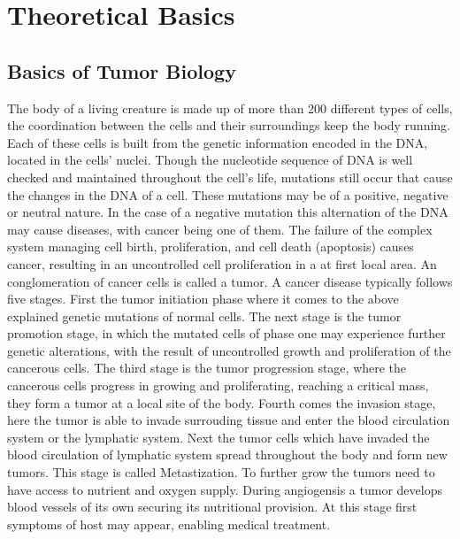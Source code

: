 \section{Theoretical Basics}
\subsection{Basics of Tumor Biology}
The body of a living creature is made up of more than 200 different types of cells, the coordination between the cells and their surroundings keep the body running. Each of these cells is built from the genetic information encoded in the DNA, located in the cells' nuclei. Though the nucleotide sequence of DNA is well checked and maintained throughout the cell's life, mutations still occur that cause the changes in the DNA of a cell. These mutations may be of a positive, negative or neutral nature. In the case of a negative mutation this alternation of the DNA may cause diseases, with cancer being one of them. The failure of the complex system managing cell birth, proliferation, and cell death (apoptosis) causes cancer, resulting in an uncontrolled cell proliferation in a at first local area. An conglomeration of cancer cells is called a tumor. \newline
A cancer disease typically follows five stages. First the tumor initiation phase where it comes to the above explained genetic mutations of normal cells. The next stage is the tumor promotion stage, in which the mutated cells of phase one may experience further genetic alterations, with the result of uncontrolled growth and proliferation of the cancerous cells. The third stage is the tumor progression stage, where the cancerous cells progress in growing and proliferating, reaching a critical mass, they form a tumor at a local site of the body. Fourth comes the invasion stage, here the tumor is able to invade surrouding tissue and enter the blood circulation system or the lymphatic system. Next the tumor cells which have invaded the blood circulation of lymphatic system spread throughout the body and form new tumors. This stage is called Metastization. To further grow the tumors need to have access to nutrient and oxygen supply. During angiogensis a tumor develops blood vessels of its own securing its nutritional provision. At this stage first symptoms of host may appear, enabling medical treatment.\newline
